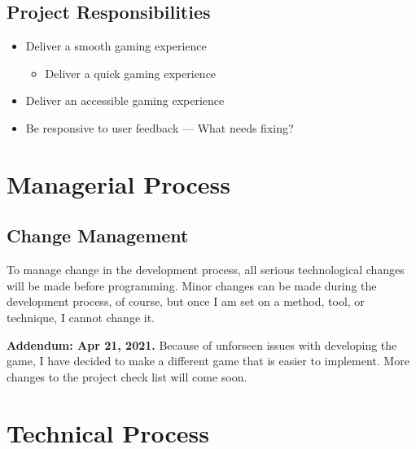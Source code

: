\documentclass[11pt]{article}
\begin{document}
\subsection{Project Responsibilities}
\label{sec:orgba5ec4a}
\begin{itemize}
\item Deliver a smooth gaming experience
\begin{itemize}
\item Deliver a quick gaming experience
\end{itemize}
\item Deliver an accessible gaming experience
\item Be responsive to user feedback --- What needs fixing?
\end{itemize}
\section{Managerial Process}
\label{sec:orgd8cc9ae}
\subsection{Change Management}
\label{sec:orgc19c968}
To manage change in the development process, all serious technological changes will be made before programming.
Minor changes can be made during the development process, of course, but once I am set on a method, tool,
or technique, I cannot change it.

\textbf{Addendum: Apr 21, 2021.}
Because of unforseen issues with developing the game, I have decided to make a different game that is easier to
implement. More changes to the project check list will come soon.
\section{Technical Process}
\label{sec:orgbd057ce}
\end{document}
